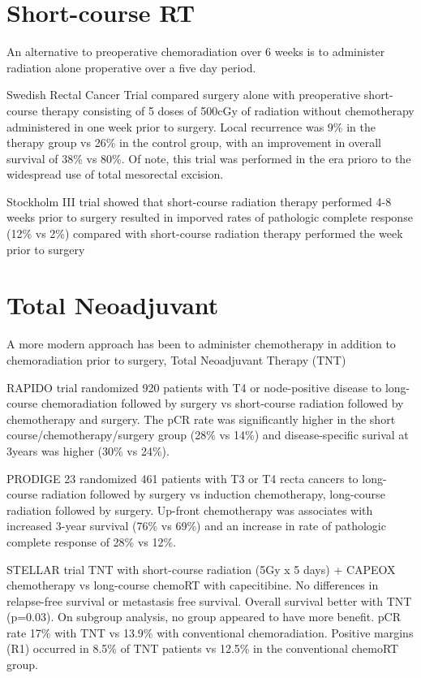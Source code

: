 \documentclass[
]{book}
\begin{document}
\hypertarget{short-course-rt}{%
\section{Short-course RT}\label{short-course-rt}}

An alternative to preoperative chemoradiation over 6 weeks is to administer radiation alone properative over a five day period.

Swedish Rectal Cancer Trial compared surgery alone with preoperative short-course therapy consisting of 5 doses of 500cGy of radiation without chemotherapy administered in one week prior to surgery. Local recurrence was 9\% in the therapy group vs 26\% in the control group, with an improvement in overall survival of 38\% vs 80\%\citep{swedishrectalcancertrial980}. Of note, this trial was performed in the era prioro to the widespread use of total mesorectal excision.

Stockholm III trial showed that short-course radiation therapy performed 4-8 weeks prior to surgery resulted in imporved rates of pathologic complete response (12\% vs 2\%) compared with short-course radiation therapy performed the week prior to surgery \citep{pettersson972}

\hypertarget{total-neoadjuvant}{%
\section{Total Neoadjuvant}\label{total-neoadjuvant}}

A more modern approach has been to administer chemotherapy in addition to chemoradiation prior to surgery, Total Neoadjuvant Therapy (TNT)

RAPIDO trial randomized 920 patients with T4 or node-positive disease to long-course chemoradiation followed by surgery vs short-course radiation followed by chemotherapy and surgery. The pCR rate was significantly higher in the short course/chemotherapy/surgery group (28\% vs 14\%) and disease-specific surival at 3years was higher (30\% vs 24\%).\citep{bahadoer29} \citep{vandervalk75}

PRODIGE 23 randomized 461 patients with T3 or T4 recta cancers to long-course radiation followed by surgery vs induction chemotherapy, long-course radiation followed by surgery. Up-front chemotherapy was associates with increased 3-year survival (76\% vs 69\%) and an increase in rate of pathologic complete response of 28\% vs 12\%.\citep{conroy702}

STELLAR trial \citep{jin1681} TNT with short-course radiation (5Gy x 5 days) + CAPEOX chemotherapy vs long-course chemoRT with capecitibine. No differences in relapse-free survival or metastasis free survival. Overall survival better with TNT (p=0.03). On subgroup analysis, no group appeared to have more benefit. pCR rate 17\% with TNT vs 13.9\% with conventional chemoradiation. Positive margins (R1) occurred in 8.5\% of TNT patients vs 12.5\% in the conventional chemoRT group.
\end{document}
